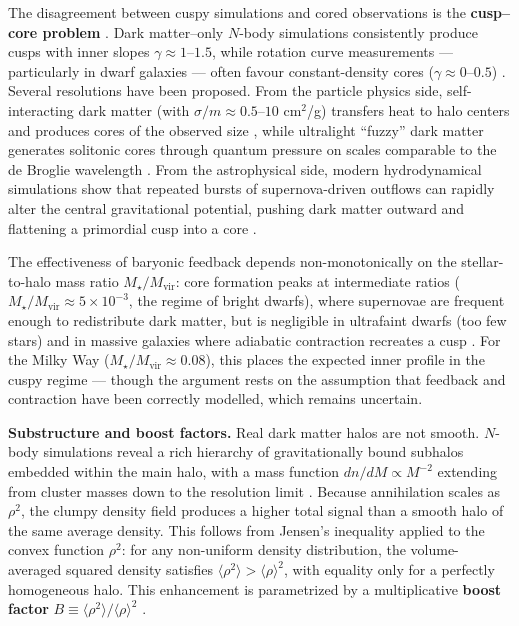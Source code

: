 The disagreement between cuspy simulations and cored observations is the \textbf{cusp--core problem} \cite{Cirelli:2024ssz,Bullock:2017xww}.
Dark matter--only $N$-body simulations consistently produce cusps with inner slopes $\gamma \approx 1$--$1.5$, while rotation curve measurements --- particularly in dwarf galaxies --- often favour constant-density cores ($\gamma \approx 0$--$0.5$) \cite{Bullock:2017xww}.
Several resolutions have been proposed.
From the particle physics side, self-interacting dark matter (with $\sigma/m \approx 0.5$--$10$ cm$^2$/g) transfers heat to halo centers and produces cores of the observed size \cite{Spergel:1999mh,Tulin:2017ara,Bullock:2017xww}, while ultralight ``fuzzy'' dark matter generates solitonic cores through quantum pressure on scales comparable to the de Broglie wavelength \cite{Hu:2000ke,Cirelli:2024ssz}.
From the astrophysical side, modern hydrodynamical simulations show that repeated bursts of supernova-driven outflows can rapidly alter the central gravitational potential, pushing dark matter outward and flattening a primordial cusp into a core \cite{Cirelli:2024ssz,Bullock:2017xww}.

The effectiveness of baryonic feedback depends non-monotonically on the stellar-to-halo mass ratio $M_\star / M_\text{vir}$: core formation peaks at intermediate ratios ($M_\star / M_\text{vir} \approx 5 \times 10^{-3}$, the regime of bright dwarfs), where supernovae are frequent enough to redistribute dark matter, but is negligible in ultrafaint dwarfs (too few stars) and in massive galaxies where adiabatic contraction recreates a cusp \cite{Cirelli:2024ssz,Bullock:2017xww}.
For the Milky Way ($M_\star / M_\text{vir} \approx 0.08$), this places the expected inner profile in the cuspy regime --- though the argument rests on the assumption that feedback and contraction have been correctly modelled, which remains uncertain.

\textbf{Substructure and boost factors.}
Real dark matter halos are not smooth.
$N$-body simulations reveal a rich hierarchy of gravitationally bound subhalos embedded within the main halo, with a mass function $dn/dM \propto M^{-2}$ extending from cluster masses down to the resolution limit \cite{Springel:2008cc,Diemand:2008in,Cirelli:2024ssz}.
Because annihilation scales as $\rho^2$, the clumpy density field produces a higher total signal than a smooth halo of the same average density.
This follows from Jensen's inequality applied to the convex function $\rho^2$: for any non-uniform density distribution, the volume-averaged squared density satisfies $\langle \rho^2 \rangle > \langle \rho \rangle^2$, with equality only for a perfectly homogeneous halo.
This enhancement is parametrized by a multiplicative \textbf{boost factor} $B \equiv \langle \rho^2 \rangle / \langle \rho \rangle^2$ \cite{Cirelli:2024ssz}.

